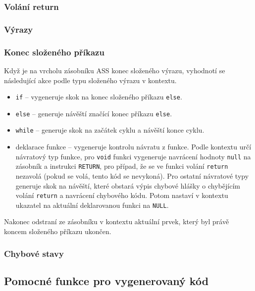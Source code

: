 \documentclass[a4paper, 12pt]{article}
\begin{document}
    \subsubsection{Volání return}
    \subsubsection{Výrazy}
    \subsubsection{Konec složeného příkazu} \label{konec slozeneho}
    Když je na vrcholu zásobníku ASS konec složeného výrazu, vyhodnotí se následující akce podle typu složeného výrazu v kontextu.
    \begin{itemize}
        \item \texttt{if} -- vygeneruje skok na konec složeného příkazu \texttt{else}.
        \item \texttt{else} -- generuje návěští značící konec příkazu \texttt{else}.
        \item \texttt{while} -- generuje skok na začátek cyklu a návěští konce cyklu.
        \item deklarace funkce -- vygeneruje kontrolu návratu z funkce. Podle kontextu určí návratový typ funkce, pro \texttt{void} funkci vygeneruje navrácení hodnoty \texttt{null} na zásobník a instrukci \texttt{RETURN}, pro případ, že se ve funkci volání \texttt{return} nezavolá (pokud se volá, tento kód se nevykoná). Pro ostatní návratové typy generuje skok na návěští, které obstará výpis chybové hlášky o chybějícím volání \texttt{return} a navrácení chybového kódu. Potom nastaví v kontextu ukazatel na aktuální deklarovanou funkci na \texttt{NULL}.
    \end{itemize}

    Nakonec odstraní ze zásobníku v kontextu aktuální prvek, který byl právě koncem složeného příkazu ukončen.
    \subsubsection{Chybové stavy}

    \subsection{Pomocné funkce pro vygenerovaný kód} \label{pomocne}

    \newpage
	\renewcommand{\refname}{Zdroje}
	\printbibliography
\end{document}
